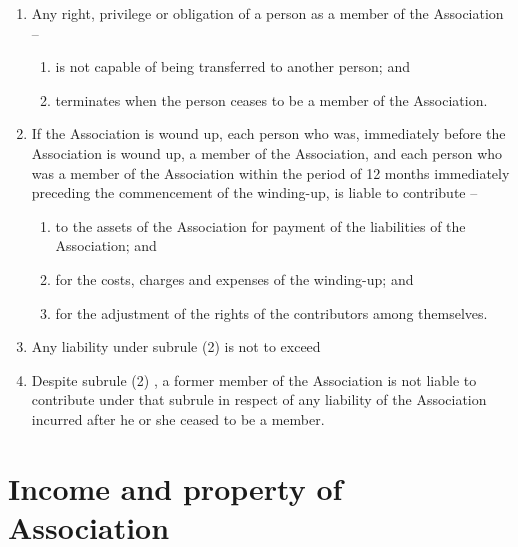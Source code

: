 \documentclass[a4paper,11pt]{article}
\begin{document}
\begin{enumerate}
	\item Any right, privilege or obligation of a person as a member of the Association --
	\begin{enumerate}
		\item is not capable of being transferred to another person; and
		\item terminates when the person ceases to be a member of the Association.
	\end{enumerate}
	
	\item If the Association is wound up, each person who was, immediately before the Association is wound up, a member of the Association, and each person who was a member of the Association within the period of 12 months immediately preceding the commencement of the winding-up, is liable to contribute --
	\begin{enumerate}
		\item to the assets of the Association for payment of the liabilities of the Association; and
		\item for the costs, charges and expenses of the winding-up; and
		\item for the adjustment of the rights of the contributors among themselves.
	\end{enumerate}
	
	\item Any liability under subrule (2) is not to exceed \orgLiabilityLimit{}
	\item Despite subrule (2) , a former member of the Association is not liable to contribute under that subrule in respect of any liability of the Association incurred after he or she ceased to be a member.
	
\end{enumerate}

\section{Income and property of Association}
\end{document}
